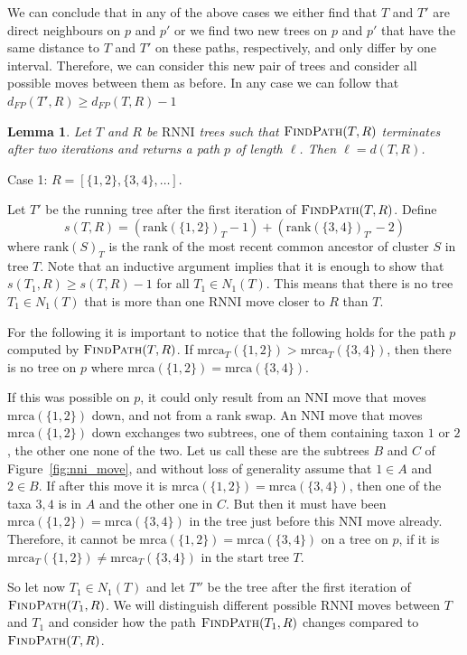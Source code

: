 \documentclass{amsart}
\newtheorem{lemma}{Lemma}
\newcommand{\rnni}{\mathrm{RNNI}}
\newcommand{\findpath}{\textsc{FindPath}}
\newcommand{\mrca}{\mathrm{mrca}}
\newcommand{\rank}{\mathrm{rank}}
\newcommand{\nni}{\mathrm{NNI}}
\begin{document}
We can conclude that in any of the above cases we either find that $T$ and $T'$ are direct neighbours on $p$ and $p'$ or we find two new trees on $p$ and $p'$ that have the same distance to $T$ and $T'$ on these paths, respectively, and only differ by one interval.
Therefore, we can consider this new pair of trees and consider all possible moves between them as before.
In any case we can follow that $d_{FP}(T',R) \geq d_{FP}(T,R) -1$
\endproof

\begin{lemma}
Let $T$ and $R$ be $\rnni$ trees such that $\findpath(T, R)$ terminates after two iterations and returns a path $p$ of length $\ell$.
Then $\ell = d(T, R)$.
\end{lemma}

\proof
Case 1: $R = [\{1, 2\}, \{3, 4\}, \ldots]$.

Let $T'$ be the running tree after the first iteration of $\findpath(T, R)$.
Define
\[
s(T, R) = (\rank(\{1,2\})_T - 1) + (\rank(\{3,4\})_{T'} - 2)
\]
where $\rank(S)_T$ is the rank of the most recent common ancestor of cluster $S$ in tree $T$.
Note that an inductive argument implies that it is enough to show that $s(T_1, R) \geq s(T, R) - 1$ for all $T_1 \in N_1(T)$.
This means that there is no tree $T_1 \in N_1(T)$ that is more than one $\rnni$ move closer to $R$ than $T$.

For the following it is important to notice that the following holds for the path $p$ computed by $\findpath(T,R)$.
If $\mrca_T(\{1,2\}) > \mrca_T(\{3,4\})$, then there is no tree on $p$ where $\mrca(\{1,2\}) = \mrca(\{3,4\})$.

If this was possible on $p$, it could only result from an $\nni$ move that moves $\mrca(\{1,2\})$ down, and not from a rank swap.
An $\nni$ move that moves $\mrca(\{1,2\})$ down exchanges two subtrees, one of them containing taxon $1$ or $2$, the other one none of the two.
Let us call these are the subtrees $B$ and $C$ of Figure~\ref{fig:nni_move}, and without loss of generality assume that $1 \in A$ and $2 \in B$.
If after this move it is $\mrca(\{1,2\}) = \mrca(\{3,4\})$, then one of the taxa $3,4$ is in $A$ and the other one in $C$.
But then it must have been $\mrca(\{1,2\}) = \mrca(\{3,4\})$ in the tree just before this $\nni$ move already.
Therefore, it cannot be $\mrca(\{1,2\}) = \mrca(\{3,4\})$ on a tree on $p$, if it is $\mrca_T(\{1,2\}) \neq \mrca_T(\{3,4\})$ in the start tree $T$.

So let now $T_1 \in N_1(T)$ and let $T''$ be the tree after the first iteration of $\findpath(T_1,R)$. We will distinguish different possible $\rnni$ moves between $T$ and $T_1$ and consider how the path $\findpath(T_1,R)$ changes compared to $\findpath(T,R)$.
\end{document}
